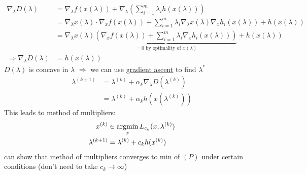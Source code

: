 \documentclass[11pt,a4paper]{article}
\newcommand{\argmin}{\operatornamewithlimits{argmin}}
\begin{document}
\begin{equation}
    \begin{aligned}
        \nabla_{\lambda}D(\lambda)&=\nabla_{\lambda}f(x(\lambda))+\nabla_\lambda\left(\sum_{i=1}^m\lambda_ih(x(\lambda))\right)\\
        &=\nabla_\lambda x(\lambda)\cdot \nabla_x f(x(\lambda))+\sum_{i=1}^m\lambda_i\nabla_{\lambda}x(\lambda)\nabla_xh_i(x(\lambda))+h(x(\lambda))\\
        &=\nabla_\lambda x(\lambda)\underbrace{\left(\nabla_x f(x(\lambda))+\sum_{i=1}^m\lambda_i \nabla_x h_i(x(\lambda))\right)}_{=0\text{ by optimality of }x(\lambda)}+h(x(\lambda))\\
        \Rightarrow	\nabla_{\lambda}D(\lambda)&=h(x(\lambda))
    \end{aligned}
    \nonumber
\end{equation}
$D(\lambda)$ is concave in $\lambda$ $\Rightarrow$ we can use \underline{gradient ascent} to find $\lambda^*$
\begin{equation}
    \begin{aligned}
        \lambda^{(k+1)}&=\lambda^{(k)}+\alpha_k \nabla_\lambda D(\lambda^{(k)})\\
        &=\lambda^{(k)}+\alpha_k h(x(\lambda^{(k)}))
    \end{aligned}
    \nonumber
\end{equation}
This leads to method of multipliers:
\begin{equation}
    \begin{aligned}
        x^{(k)}&\in\argmin_{x}L_{c_k}(x,\lambda^{(k)})\\
        \lambda^{(k+1)}&=\lambda^{(k)}+c_k h(x^{(k)})
    \end{aligned}
    \nonumber
\end{equation}
can show that method of multipliers converges to min of $(P)$ under certain conditions (don't need to take $c_k \rightarrow \infty$)
\end{document}
